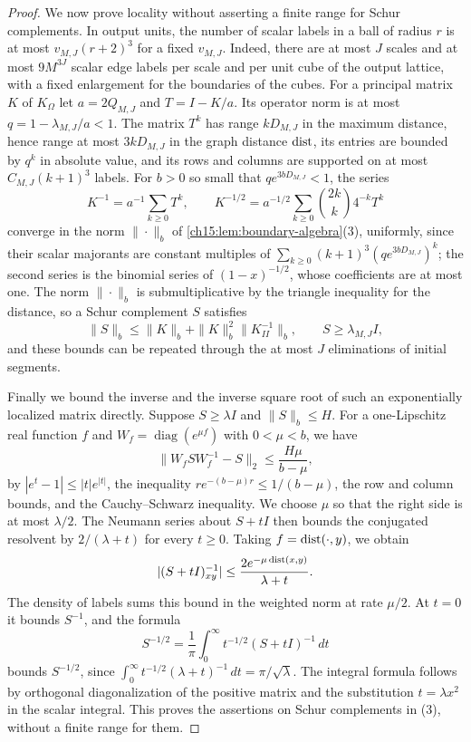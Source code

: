 \begin{proof}
We now prove locality without asserting a finite range for Schur complements. In output units, the number of scalar labels in a ball of radius $r$ is at most $v_{M,J}(r+2)^3$ for a fixed $v_{M,J}$. Indeed, there are at most $J$ scales and at most $9M^{3J}$ scalar edge labels per scale and per unit cube of the output lattice, with a fixed enlargement for the boundaries of the cubes. For a principal matrix $K$ of $K_\Omega$ let $a=2Q_{M,J}$ and $T=I-K/a$. Its operator norm is at most $q=1-\lambda_{M,J}/a<1$. The matrix $T^k$ has range $kD_{M,J}$ in the maximum distance, hence range at most $3kD_{M,J}$ in the graph distance $\operatorname{dist}$, its entries are bounded by $q^k$ in absolute value, and its rows and columns are supported on at most $C_{M,J}(k+1)^3$ labels. For $b>0$ so small that $qe^{3bD_{M,J}}<1$, the series
\begin{equation}\label{ch15:eq:bare-neumann}
 K^{-1}=a^{-1}\sum_{k\ge0}T^k,\qquad
 K^{-1/2}=a^{-1/2}\sum_{k\ge0}
                       \binom{2k}{k}4^{-k}T^k
\end{equation}
converge in the norm $\|\cdot\|_b$ of \cref{ch15:lem:boundary-algebra}(3), uniformly, since their scalar majorants are constant multiples of $\sum_{k\ge0}(k+1)^3(qe^{3bD_{M,J}})^k$; the second series is the binomial series of $(1-x)^{-1/2}$, whose coefficients are at most one. The norm $\|\cdot\|_b$ is submultiplicative by the triangle inequality for the distance, so a Schur complement $S$ satisfies
\[
 \|S\|_b\le\|K\|_b+\|K\|_b^2\|K_{II}^{-1}\|_b,
 \qquad S\ge\lambda_{M,J}I ,
\]
and these bounds can be repeated through the at most $J$ eliminations of initial segments.

Finally we bound the inverse and the inverse square root of such an exponentially localized matrix directly. Suppose $S\ge\lambda I$ and $\|S\|_b\le H$. For a one-Lipschitz real function $f$ and $W_f=\operatorname{diag}(e^{\mu f})$ with $0<\mu<b$, we have
\[
 \|W_fSW_f^{-1}-S\|_2\le\frac{H\mu}{b-\mu},
\]
by $|e^t-1|\le|t|e^{|t|}$, the inequality $re^{-(b-\mu)r}\le1/(b-\mu)$, the row and column bounds, and the Cauchy--Schwarz inequality. We choose $\mu$ so that the right side is at most $\lambda/2$. The Neumann series about $S+tI$ then bounds the conjugated resolvent by $2/(\lambda+t)$ for every $t\ge0$. Taking $f=\operatorname{dist}(\cdot,y)$, we obtain
\[
 |(S+tI)^{-1}_{xy}|\le
          \frac{2e^{-\mu\operatorname{dist}(x,y)}}{\lambda+t} .
\]
The density of labels sums this bound in the weighted norm at rate $\mu/2$. At $t=0$ it bounds $S^{-1}$, and the formula
\[
 S^{-1/2}=\frac1\pi\int_0^\infty
                         t^{-1/2}(S+tI)^{-1}\,dt
\]
bounds $S^{-1/2}$, since $\int_0^\infty t^{-1/2}(\lambda+t)^{-1}\,dt=\pi/\sqrt\lambda$. The integral formula follows by orthogonal diagonalization of the positive matrix and the substitution $t=\lambda x^2$ in the scalar integral. This proves the assertions on Schur complements in (3), without a finite range for them.


\end{proof}
